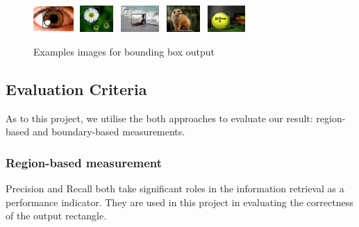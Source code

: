 \documentclass[10pt,twocolumn,letterpaper]{article}
\begin{document}
\begin{figure}[t]
\begin{center}
    \includegraphics[width=0.6in,height=0.4in]{./Figures/boundingbox/5_155_155096RECT.jpg}
    \includegraphics[width=0.6in,height=0.4in]{./Figures/boundingbox/5_155_155145RECT.jpg}
    \includegraphics[width=0.6in,height=0.4in]{./Figures/boundingbox/5_155_155333RECT.jpg}
    \includegraphics[width=0.6in,height=0.4in]{./Figures/boundingbox/5_155_155196RECT.jpg}
    \includegraphics[width=0.6in,height=0.4in]{./Figures/boundingbox/5_155_155459RECT.jpg} \\
    \caption{Examples images for bounding box output}
\end{center}
\end{figure}


\subsection{Evaluation Criteria}
As to this project, we utilise the both approaches to evaluate our result:
region-based and boundary-based measurements.

\subsubsection{Region-based measurement}
Precision and Recall both take significant roles in the information retrieval as a performance indicator.  They are used in this project in evaluating the correctness of the output rectangle.
\end{document}
